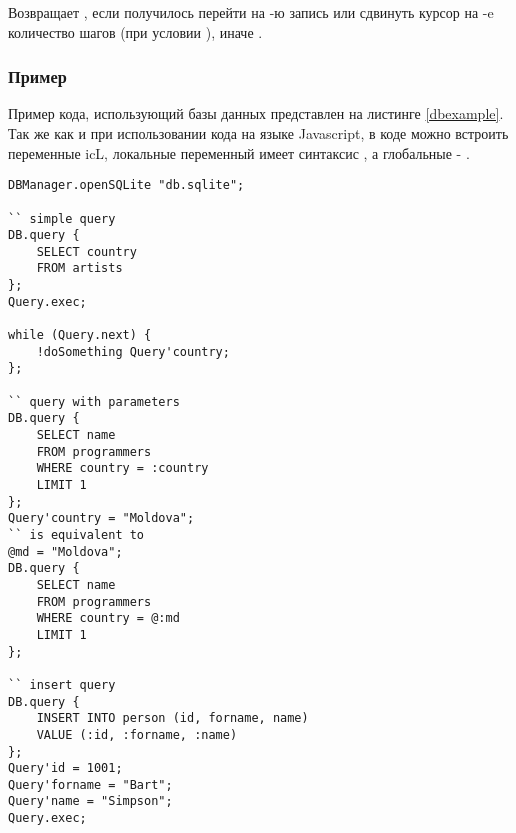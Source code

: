 Возвращает \true, если получилось перейти на -ю запись или сдвинуть курсор на -e количество шагов (при условии ), иначе \false.

\subsubsection{Пример}

Пример кода, использующий базы данных представлен на листинге \ref{dbexample}. Так же как и при использовании кода на языке Javascript, в коде можно встроить переменные icL, локальные переменный имеет синтаксис , а глобальные - .

\begin{lstlisting}[caption=Пример кода использующий базу данных, label=dbexample]
DBManager.openSQLite "db.sqlite";

`` simple query
DB.query {
	SELECT country
	FROM artists
};
Query.exec;

while (Query.next) {
	!doSomething Query'country;
};

`` query with parameters
DB.query {
	SELECT name
	FROM programmers
	WHERE country = :country
	LIMIT 1
};
Query'country = "Moldova";
`` is equivalent to
@md = "Moldova";
DB.query {
	SELECT name
	FROM programmers
	WHERE country = @:md
	LIMIT 1
};

`` insert query
DB.query {
	INSERT INTO person (id, forname, name)
	VALUE (:id, :forname, :name)
};
Query'id = 1001;
Query'forname = "Bart";
Query'name = "Simpson";
Query.exec;
\end{lstlisting}


